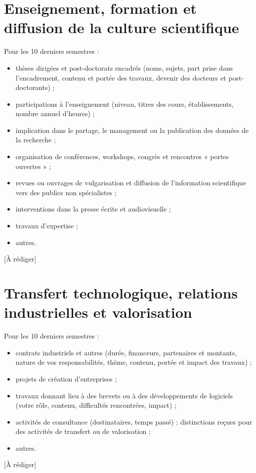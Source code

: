 \documentclass[10pt,a4paper]{article}
\newcommand{\arediger}{\textcolor{gris}{[À rédiger]}}
\begin{document}
\section{Enseignement, formation et diffusion de la culture scientifique}
\begin{consigne}
Pour les 10 derniers semestres :
\begin{itemize}
  \item thèses dirigées et post-doctorats encadrés (noms, sujets, part prise dans l'encadrement, contenu et portée des travaux, devenir des docteurs et post-doctorants) ;
  \item participations à l'enseignement (niveau, titres des cours, établissements, nombre annuel d'heures) ;
  \item implication dans le partage, le management ou la publication des données de la recherche ;
  \item organisation de conférences, workshops, congrès et rencontres « portes ouvertes » ;
  \item revues ou ouvrages de vulgarisation et diffusion de l'information scientifique vers des publics non spécialistes ;
  \item interventions dans la presse écrite et audiovisuelle ;
  \item travaux d'expertise ;
  \item autres.
\end{itemize}
\end{consigne}
\arediger %

\section{Transfert technologique, relations industrielles et valorisation}
\begin{consigne}
Pour les 10 derniers semestres :
\begin{itemize}
  \item contrats industriels et autres (durée, financeurs, partenaires et montants, nature de vos responsabilités, thème, contenu, portée et impact des travaux) ;
  \item projets de création d'entreprises ;
  \item travaux donnant lieu à des brevets ou à des développements de logiciels (votre rôle, contenu, difficultés rencontrées, impact) ;
  \item activités de consultance (destinataires, temps passé) ; distinctions reçues pour des activités de transfert ou de valorisation ;
  \item autres.
\end{itemize}
\end{consigne}
\arediger %
\end{document}
